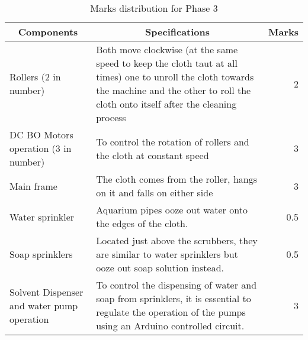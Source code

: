 \documentclass[table,french,english]{rapportCS}
\begin{document}
\begin{table}[h]
\begin{center}
\begin{tabular}{|p{3cm}|p{10cm}|r|}
\hline
    \multicolumn{1}{|c|}{\textbf{Components}} & \multicolumn{1}{|c|}{\textbf{Specifications}} & \multicolumn{1}{|c|}{\textbf{Marks}} \\
\hline
Rollers (2 in number) & Both move clockwise (at the same speed to keep the cloth taut at all times) one to unroll the cloth towards the machine and the other to roll the cloth onto itself after the cleaning process & 2 \\
\hline
DC BO Motors operation (3 in number) & To control the rotation of rollers and the cloth at constant speed & 3 \\
\hline
Main frame & The cloth comes from the roller, hangs on it and falls on either side &	3 \\
\hline
Water sprinkler & Aquarium pipes ooze out water onto the edges of the cloth. & 0.5\\
\hline
Soap sprinklers	& Located just above the scrubbers, they are similar to water sprinklers but ooze out soap solution instead. & 0.5 \\
\hline
Solvent Dispenser and water pump operation & To control the dispensing of water and soap from sprinklers, it is essential to regulate the operation of the pumps using an Arduino controlled circuit.	& 3 \\
\hline

\end{tabular}
\caption{Marks distribution for Phase 3}
\end{center}
\end{table}
\end{document}
